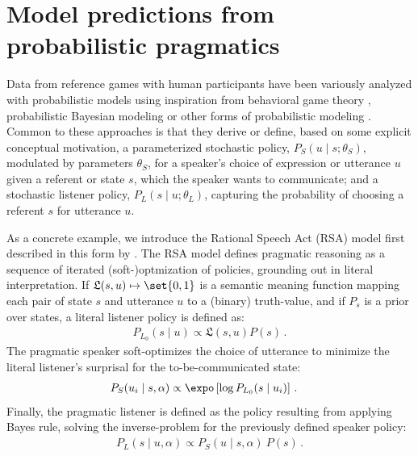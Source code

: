 \documentclass[fleqn]{article}
\begin{document}
\section{Model predictions from probabilistic pragmatics}
\label{sec:model-pred-from}

Data from reference games with human participants have been variously analyzed with probabilistic models using inspiration from behavioral game theory \citep[e.g.,][]{DegenFranke2013:Cost-Based-Prag,QingFranke2013:Variations-on-a}, probabilistic Bayesian modeling \citep[e.g.,][]{FrankGoodman2012:Predicting-Prag,FrankeDegen2015:Reasoning-in-Re} or other forms of probabilistic modeling \citep[e.g.,][]{GattGompel2013:Are-we-Bayesian}.
Common to these approaches is that they derive or define, based on some explicit conceptual motivation, a parameterized stochastic policy, $P_{S}(u \mid s; \theta_{S})$, modulated by parameters $\theta_{S}$, for a speaker's choice of expression or utterance $u$ given a referent or state $s$, which the speaker wants to communicate;
and a stochastic listener policy, $P_{L}(s \mid u; \theta_{L})$, capturing the probability of choosing a referent $s$ for utterance $u$.

As a concrete example, we introduce the Rational Speech Act (RSA) model first described in this form by \citet{FrankGoodman2012:Predicting-Prag} \citep[for overview see][]{FrankeJager2015:Probabilistic-p,GoodmanFrank2016:Pragmatic-Langu,StevensBenz2018:Game-Theoretic-,ScontrasTessler2021:A-practical-int,Degen2023:The-Rational-Sp}.
The RSA model defines pragmatic reasoning as a sequence of iterated (soft-)optmization of policies, grounding out in literal interpretation.
If $\mathfrak{L}(s,u) \mapsto \set{0,1}$ is a semantic meaning function mapping each pair of state $s$ and utterance $u$ to a (binary) truth-value, and if $P_{s}$ is a prior over states, a literal listener policy is defined as:
%
\begin{align*}
 P_{L_{0}}(s \mid u) \propto \mathfrak{L}(s,u) P(s)\,.
\end{align*}
%
The pragmatic speaker soft-optimizes the choice of utterance to minimize the literal listener's surprisal for the to-be-communicated state:
%
\begin{align*}
  P_{S}(u_{i} \mid s, \alpha) & \propto \expo \left [ \log P_{L_{0}}(s \mid u_{i}) \right ] \,.
\end{align*}
%
Finally, the pragmatic listener is defined as the policy resulting from applying Bayes rule, solving the inverse-problem for the previously defined speaker policy:
%
\begin{align*}
  P_{L}(s \mid u, \alpha) \propto  P_{S}(u \mid s, \alpha) \  P(s) \,.
\end{align*}
\end{document}
